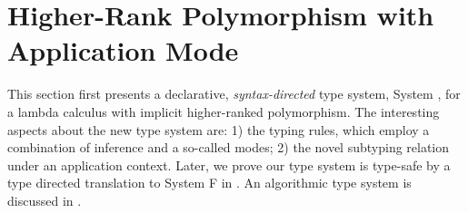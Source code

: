 \chapter{Higher-Rank Polymorphism with Application Mode}
\label{chap:BiDirectional}

This section first presents a declarative, \emph{syntax-directed} type system,
System \ap,
for a lambda calculus with implicit higher-ranked polymorphism. The interesting
aspects about the new type system are: 1) the typing rules, which employ a
combination of inference and a so-called \textit{\mode} modes; 2) the novel
subtyping relation under an application context. Later, we prove our type system
is type-safe by a type directed translation to System F in
. An algorithmic type system is discussed in
.











